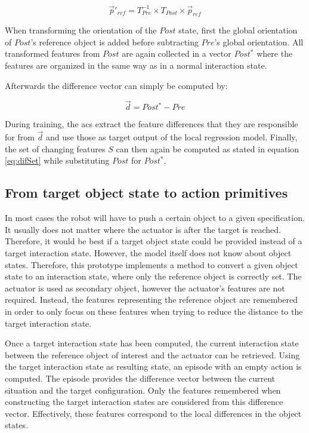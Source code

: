 \begin{equation}
\vec{p}'_{ref} = T^{-1}_{Pre} \times T_{Post} \times \vec{p}_{ref}
\end{equation}

When transforming the orientation of the $Post$ state, first the global orientation of $Post$'s reference object is added before subtracting $Pre$'s global orientation. All transformed features from $Post$ are again collected in a vector $Post^*$ where the features are organized in the same way as in a normal interaction state.

Afterwards the difference vector can simply be computed by:

\begin{equation}
\vec{d} = Post^* - Pre
\end{equation}

During training, the \glspl{ac} extract the feature differences that they are responsible for from $\vec{d}$ and use those as target output of the local regression model.
Finally, the set of changing features $S$ can then again be computed as stated in equation \ref{eq:difSet} while substituting $Post$ for $Post^*$.

\subsection{From target object state to action primitives\label{sec:pairPlanningReal}}

In most cases the robot will have to push a certain object to a given specification. It usually does not matter where the actuator is after the target is reached. Therefore, it would be best if a target object state could be provided instead of a target interaction state. However, the model itself does not know about object states. Therefore, this prototype implements a method to convert a given object state to an interaction state, where only the reference object is correctly set. The actuator is used as secondary object, however the actuator's features are not required. Instead, the features representing the reference object are remembered in order to only focus on these features when trying to reduce the distance to the target interaction state. 

Once a target interaction state has been computed, the current interaction state between the reference object of interest and the actuator can be retrieved. Using the target interaction state as resulting state, an episode with an empty action is computed. The episode provides the difference vector between the current situation and the target configuration. Only the features remembered when constructing the target interaction states are considered from this difference vector. Effectively, these features correspond to the local differences in the object states. 

